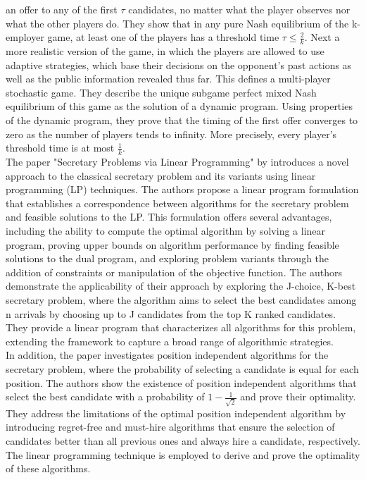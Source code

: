 \documentclass{article}
\begin{document}
an offer to any of the first $\tau$ candidates, no matter what the player observes nor what the other players do. They show that in any pure Nash equilibrium of the k-employer game, at least one of the players has a threshold time $\tau \leq \frac{2}{k}$. Next a more realistic version of the game, in which the players are allowed to use adaptive strategies, which base their decisions on the opponent’s past actions as well as the public information revealed thus far. This defines a multi-player stochastic game. They describe the unique subgame perfect mixed Nash equilibrium of this game as the solution of a dynamic program. Using properties of the dynamic program, they prove that the timing of the first offer converges to zero as the number of players tends to infinity. More precisely, every player’s threshold time is at most $\frac{1}{k}$.
\\[2ex]
The paper "Secretary Problems via Linear Programming" by \cite{buchbinder2014secretary} introduces a novel approach to the classical secretary problem and its variants using linear programming (LP) techniques. The authors propose a linear program formulation that establishes a correspondence between algorithms for the secretary problem and feasible solutions to the LP. This formulation offers several advantages, including the ability to compute the optimal algorithm by solving a linear program, proving upper bounds on algorithm performance by finding feasible solutions to the dual program, and exploring problem variants through the addition of constraints or manipulation of the objective function. The authors demonstrate the applicability of their approach by exploring the J-choice, K-best secretary problem, where the algorithm aims to select the best candidates among n arrivals by choosing up to J candidates from the top K ranked candidates. They provide a linear program that characterizes all algorithms for this problem, extending the framework to capture a broad range of algorithmic strategies.
\\[2ex]
In addition, the paper investigates position independent algorithms for the secretary problem, where the probability of selecting a candidate is equal for each position. The authors show the existence of position independent algorithms that select the best candidate with a probability of $1-\frac{1}{\sqrt{2}} $ and prove their optimality. They address the limitations of the optimal position independent algorithm by introducing regret-free and must-hire algorithms that ensure the selection of candidates better than all previous ones and always hire a candidate, respectively. The linear programming technique is employed to derive and prove the optimality of these algorithms.
\end{document}
